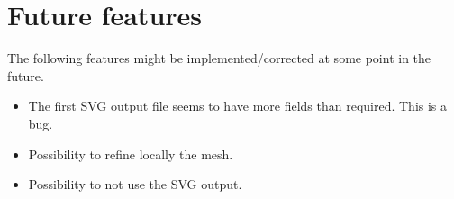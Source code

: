 \documentclass[10pt]{article}
\begin{document}










\section{Future features}

The following features might be implemented/corrected at some point in the future.

\begin{itemize}
	\item The first SVG output file seems to have more fields than required. This is a bug.
	\item Possibility to refine locally the mesh.
	\item Possibility to not use the SVG output.
\end{itemize}
\end{document}
